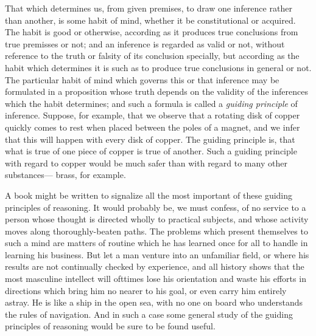 \documentclass[]{article}
\begin{document}
That which determines us, from given premises, to draw one inference rather than another, is some habit of mind, whether it be constitutional or acquired. The habit is good or otherwise, according as it produces true conclusions from true premisses or not; and an inference is regarded as valid or not, without reference to the truth or falsity of its conclusion specially, but according as the habit which determines it is such as to produce true conclusions in general or not. The particular habit of mind which governs this or that inference may be formulated in a proposition whose truth depends on the validity of the inferences which the habit determines; and such a formula is called a \emph{guiding principle} of inference. Suppose, for example, that we observe that a rotating disk of copper quickly comes to rest when placed between the poles of a magnet, and we infer that this will happen with every disk of copper. The guiding principle is, that what is true of one piece of copper is true of another. Such a guiding principle with regard to copper would be much safer than with regard to many other substances--- brass, for example.


A book might be written to signalize all the most important of these guiding principles of reasoning. It would probably be, we must confess, of no service to a person whose thought is directed wholly to practical subjects, and whose activity moves along thoroughly-beaten paths. The problems which present themselves to such a mind are matters of routine which he has learned once for all to handle in learning his business. But let a man venture into an unfamiliar field, or where his results are not continually checked by experience, and all history shows that the most masculine intellect will ofttimes lose his orientation and waste his efforts in directions which bring him no nearer to his goal, or even carry him entirely astray. He is like a ship in the open sea, with no one on board who understands the rules of navigation. And in such a case some general study of the guiding principles of reasoning would be sure to be found useful.
\end{document}
